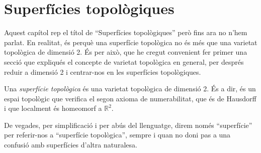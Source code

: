 \documentclass[../main.tex]{subfiles}
\begin{document}
\section{Superfícies topològiques}

Aquest capítol rep el títol de ``Superfícies topològiques'' però fins ara no n'hem parlat. En realitat, és perquè una superfície topològica no és més que una varietat topològica de dimensió 2. És per això, que he cregut convenient fer primer una secció que expliqués el concepte de varietat topològica en general, per després reduir a dimensió 2 i centrar-nos en les superfícies topològiques.

\begin{defi}
\label{def:superficietopologica} Una \textit{superfície topològica} és una varietat topològica de dimensió 2. És a dir, és un espai topològic que verifica el segon axioma de numerabilitat, que és de Hausdorff i que localment és homeomorf a $\mathbb{R}^2$.
\end{defi}

De vegades, per simplificació i per abús del llenguatge, direm només ``superfície'' per referir-nos a ``superfície topològica'', sempre i quan no doni pas a una confusió amb superfícies d'altra naturalesa.
\end{document}
